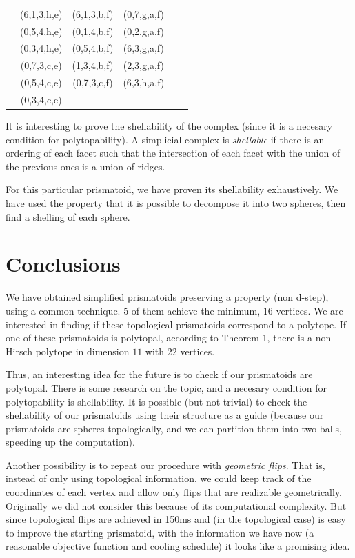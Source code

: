 \documentclass[12pt,a4paper]{article}
\theoremstyle{plain}
\theoremstyle{definition}
\begin{document}
\begin{tabular} {c|cc|cc|c}
            & (6,1,3,h,e) & (6,1,3,b,f) & (0,7,g,a,f) &             &             \\
            & (0,5,4,h,e) & (0,1,4,b,f) & (0,2,g,a,f) &             &             \\
            & (0,3,4,h,e) & (0,5,4,b,f) & (6,3,g,a,f) &             &             \\
            & (0,7,3,c,e) & (1,3,4,b,f) & (2,3,g,a,f) &             &             \\
            & (0,5,4,c,e) & (0,7,3,c,f) & (6,3,h,a,f) &             &             \\
            & (0,3,4,c,e) &             &             &             &             
\end{tabular}

It is interesting to prove the shellability of the complex (since it is a necesary condition for polytopability). A simplicial complex is \emph{shellable} if there is an ordering of each facet such that the intersection of each facet with the union of the previous ones is a union of ridges.

For this particular prismatoid, we have proven its shellability exhaustively. We have used the property that it is possible to decompose it into two spheres, then find a shelling of each sphere. 

\section{Conclusions}
We have obtained simplified prismatoids preserving a property (non d-step), using a common technique. 5 of them achieve the minimum, 16 vertices. We are interested in finding if these topological prismatoids correspond to a polytope. If one of these prismatoids is polytopal, according to Theorem 1, there is a non-Hirsch polytope in dimension $11$ with $22$ vertices.

Thus, an interesting idea for the future is to check if our prismatoids are polytopal. There is some research on the topic, and a necesary condition for polytopability is shellability. It is possible (but not trivial) to check the shellability of our prismatoids using their structure as a guide (because our prismatoids are spheres topologically, and we can partition them into two balls, speeding up the computation).

Another possibility is to repeat our procedure with \emph{geometric flips}. That is, instead of only using topological information, we could keep track of the coordinates of each vertex and allow only flips that are realizable geometrically. Originally we did not consider this because of its computational complexity. But since topological flips are achieved in 150ms and (in the topological case) is easy to improve the starting prismatoid, with the information we have now (a reasonable objective function and cooling schedule) it looks like a promising idea.
\end{document}
